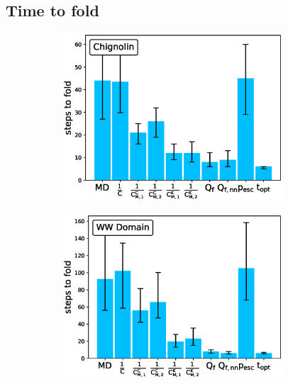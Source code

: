 \subsection{\label{sec:time-fold}Time to fold}

\begin{figure}[t!]
  \begin{subfigure}[t]{0.5\textwidth}
    \includegraphics[width=0.9\textwidth]{figures/CLN025_7_steps10000_nparallel100_fold.eps}
  \end{subfigure}
  \begin{subfigure}[t]{0.5\textwidth}
    \includegraphics[width=0.9\textwidth]{figures/GTT_7_steps10000_nparallel100_fold.eps}
  \end{subfigure}
  \begin{subfigure}[t]{0.5\textwidth}

\end{subfigure}
\end{figure}
